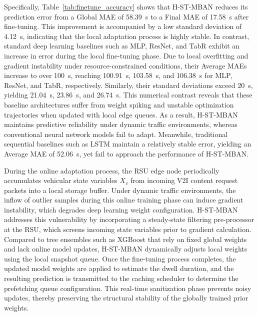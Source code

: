 \documentclass[journal]{IEEEtran}
\begin{document}
Specifically, Table~\ref{tab:finetune_accuracy} shows that H-ST-MBAN reduces its prediction error from a Global MAE of 58.39~s to a Final MAE of 17.58~s after fine-tuning. This improvement is accompanied by a low standard deviation of 4.12~s, indicating that the local adaptation process is highly stable. In contrast, standard deep learning baselines such as MLP, ResNet, and TabR exhibit an increase in error during the local fine-tuning phase. Due to local overfitting and gradient instability under resource-constrained conditions, their Average MAEs increase to over 100~s, reaching 100.91~s, 103.58~s, and 106.38~s for MLP, ResNet, and TabR, respectively. Similarly, their standard deviations exceed 20~s, yielding 21.04~s, 23.86~s, and 26.74~s. This numerical contrast reveals that these baseline architectures suffer from weight spiking and unstable optimization trajectories when updated with local edge queues. As a result, H-ST-MBAN maintains predictive reliability under dynamic traffic environments, whereas conventional neural network models fail to adapt. Meanwhile, traditional sequential baselines such as LSTM maintain a relatively stable error, yielding an Average MAE of 52.06~s, yet fail to approach the performance of H-ST-MBAN.

During the online adaptation process, the RSU edge node periodically accumulates vehicular state variables $X_v$ from incoming V2I content request packets into a local storage buffer. Under dynamic traffic environments, the inflow of outlier samples during this online training phase can induce gradient instability, which degrades deep learning weight configuration. H-ST-MBAN addresses this vulnerability by incorporating a steady-state filtering pre-processor at the RSU, which screens incoming state variables prior to gradient calculation. Compared to tree ensembles such as XGBoost that rely on fixed global weights and lack online model updates, H-ST-MBAN dynamically adjusts local weights using the local snapshot queue. Once the fine-tuning process completes, the updated model weights are applied to estimate the dwell duration, and the resulting prediction is transmitted to the caching scheduler to determine the prefetching queue configuration. This real-time sanitization phase prevents noisy updates, thereby preserving the structural stability of the globally trained prior weights.
\end{document}
